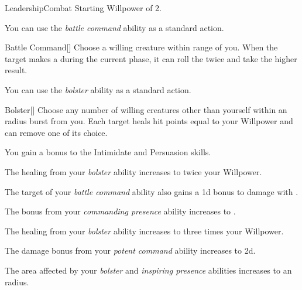     \begin{feat}{Leadership}{Combat}
        \featpre Starting Willpower of 2.

         You can use the \textit{battle command} ability as a standard action.
        \begin{freeability}{Battle Command}[]
            Choose a willing creature within \rngmed range of you.
            When the target makes a  during the current phase, it can roll the  twice and take the higher result.
        \end{freeability}

         You can use the \textit{bolster} ability as a standard action.
        \begin{apability}{Bolster}[]
            Choose any number of willing creatures other than yourself within an \areamed radius burst from you.
            Each target heals hit points equal to your Willpower and can remove one  of its choice.
        \end{apability}

         You gain a  bonus to the Intimidate and Persuasion skills.

         The healing from your \textit{bolster} ability increases to twice your Willpower.

         The target of your \textit{battle command} ability also gains a \plus1d bonus to damage with .

         The bonus from your \textit{commanding presence} ability increases to .

         The healing from your \textit{bolster} ability increases to three times your Willpower.

         The damage bonus from your \textit{potent command} ability increases to \plus2d.

         The area affected by your \textit{bolster} and \textit{inspiring presence} abilities increases to an \areahuge radius.
    \end{feat}

